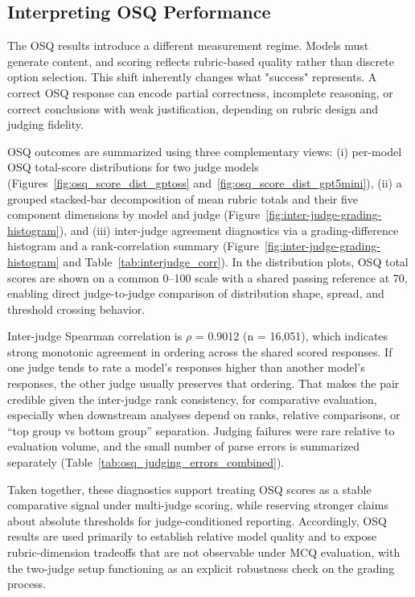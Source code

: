 \subsection{Interpreting OSQ Performance}

The OSQ results introduce a different measurement regime. Models must generate content, and scoring reflects rubric-based quality rather than discrete option selection. This shift inherently changes what "success" represents. A correct OSQ response can encode partial correctness, incomplete reasoning, or correct conclusions with weak justification, depending on rubric design and judging fidelity.

OSQ outcomes are summarized using three complementary views: (i) per-model OSQ total-score distributions for two judge models (Figures~\ref{fig:osq_score_dist_gptoss} and~\ref{fig:osq_score_dist_gpt5mini}), (ii) a grouped stacked-bar decomposition of mean rubric totals and their five component dimensions by model and judge (Figure~\ref{fig:inter-judge-grading-histogram}), and (iii) inter-judge agreement diagnostics via a grading-difference histogram and a rank-correlation summary (Figure~\ref{fig:inter-judge-grading-histogram} and Table~\ref{tab:interjudge_corr}). In the distribution plots, OSQ total scores are shown on a common 0--100 scale with a shared passing reference at 70, enabling direct judge-to-judge comparison of distribution shape, spread, and threshold crossing behavior.

Inter-judge Spearman correlation is $\rho$ = 0.9012 (n = 16,051), which indicates strong monotonic agreement in ordering across the shared scored responses. If one judge tends to rate a model’s responses higher than another model’s responses, the other judge usually preserves that ordering. That makes the pair credible given the inter-judge rank consistency, for comparative evaluation, especially when downstream analyses depend on ranks, relative comparisons, or “top group vs bottom group” separation.  Judging failures were rare relative to evaluation volume, and the small number of parse errors is summarized separately (Table~\ref{tab:osq_judging_errors_combined}).

Taken together, these diagnostics support treating OSQ scores as a stable comparative signal under multi-judge scoring, while reserving stronger claims about absolute thresholds for judge-conditioned reporting. Accordingly, OSQ results are used primarily to establish relative model quality and to expose rubric-dimension tradeoffs that are not observable under MCQ evaluation, with the two-judge setup functioning as an explicit robustness check on the grading process.



